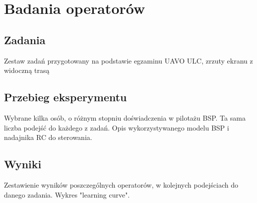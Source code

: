 \newpage
\section{Badania operatorów}

\subsection{Zadania}
\begin{todo}
    Zestaw zadań przygotowany na podstawie egzaminu UAVO ULC, zrzuty ekranu z widoczną trasą
\end{todo}

\subsection{Przebieg eksperymentu}
\begin{todo}
    Wybrane kilka osób, o różnym stopniu doświadczenia w pilotażu BSP. Ta sama liczba podejść do każdego z zadań. Opis wykorzystywanego modelu BSP i nadajnika RC do sterowania.
\end{todo}

\subsection{Wyniki}
\begin{todo}
    Zestawienie wyników poszczególnych operatorów, w kolejnych podejściach do danego zadania. Wykres "learning curve".
\end{todo}